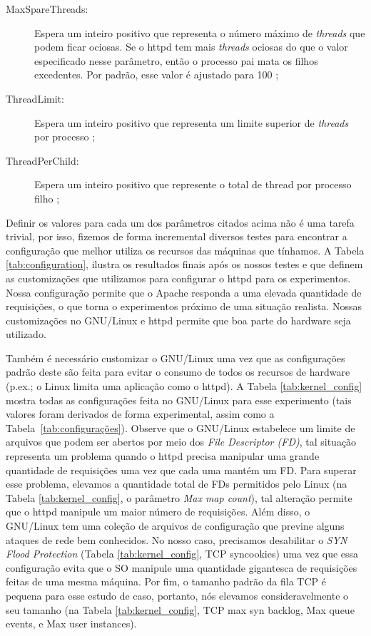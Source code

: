 \begin{description}
  \item [MaxSpareThreads:]
Espera um inteiro positivo que representa o número máximo de \emph{threads} que podem
ficar ociosas. Se o httpd tem mais \emph{threads} ociosas do que o valor especificado
nesse parâmetro, então o processo pai mata os filhos excedentes. Por padrão,
esse valor é ajustado para 100 \citep{mpm_maxsparethreads};

  \item [ThreadLimit:]
Espera um inteiro positivo que representa um limite superior de \emph{threads} por
processo \citep{mpm_threadlimits};

  \item [ThreadPerChild:]
Espera um inteiro positivo que represente o total de thread por processo filho
\citep{mpm_threadperchild};

\end{description}



Definir os valores para cada um dos parâmetros citados acima não é uma tarefa
trivial, por isso, fizemos de forma incremental diversos testes para encontrar
a configuração que melhor utiliza os recursos das máquinas que tínhamos.  A
Tabela \ref{tab:configuration}, ilustra os resultados finais após os nossos
testes e que definem as customizações que utilizamos para configurar o httpd
para os experimentos. Nossa configuração permite que o Apache responda a uma
elevada quantidade de requisições, o que torna o experimentos próximo de uma
situação realista. Nossas customizações no GNU/Linux e httpd permite que boa
parte do hardware seja utilizado.



Também é necessário customizar o GNU/Linux uma vez que as configurações padrão
deste são feita para evitar o consumo de todos os recursos de hardware (p.ex.;
o Linux limita uma aplicação como o httpd). A Tabela \ref{tab:kernel_config}
mostra todas as configurações feita no GNU/Linux para esse experimento (tais
valores foram derivados de forma experimental, assim como a
Tabela~\ref{tab:configurações}).  Observe que o GNU/Linux estabelece um limite
de arquivos que podem ser abertos por meio dos \emph{File Descriptor (FD)}, tal
situação representa um problema quando o httpd precisa manipular uma grande
quantidade de requisições uma vez que cada uma mantém um FD. Para superar esse
problema, elevamos a quantidade total de FDs permitidos pelo Linux (na Tabela
\ref{tab:kernel_config}, o parâmetro \emph{Max map count}), tal alteração
permite que o httpd manipule um maior número de requisições. Além disso, o
GNU/Linux tem uma coleção de arquivos de configuração que previne alguns
ataques de rede bem conhecidos. No nosso caso, precisamos desabilitar o
\emph{SYN Flood Protection} (Tabela \ref{tab:kernel_config}, TCP syncookies)
uma vez que essa configuração evita que o SO manipule uma quantidade gigantesca
de requisições feitas de uma mesma máquina. Por fim, o tamanho padrão da fila
TCP é pequena para esse estudo de caso, portanto, nós elevamos
consideravelmente o seu tamanho (na Tabela \ref{tab:kernel_config}, TCP max syn
backlog, Max queue events, e Max user instances).

